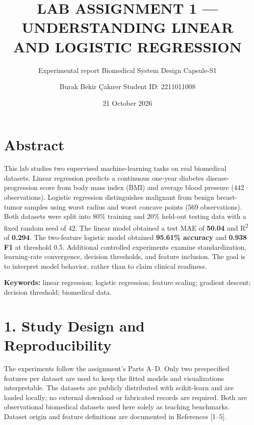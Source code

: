 \documentclass[
  10pt,
]{article}
\title{LAB ASSIGNMENT 1 --- UNDERSTANDING LINEAR AND LOGISTIC
REGRESSION}
\subtitle{Experimental report \textbar{} Biomedical System Design
Capsule-S1}
\author{Burak Bekir Çakırer \textbar{} Student ID: 2211011008}
\date{21 October 2026}
\begin{document}
\maketitle

\section{Abstract}\label{abstract}

This lab studies two supervised machine-learning tasks on real
biomedical datasets. Linear regression predicts a continuous one-year
diabetes disease-progression score from body mass index (BMI) and
average blood pressure (442 observations). Logistic regression
distinguishes malignant from benign breast-tumor samples using worst
radius and worst concave points (569 observations). Both datasets were
split into 80\% training and 20\% held-out testing data with a fixed
random seed of 42. The linear model obtained a test MAE of
\textbf{50.04} and R\textsuperscript{2} of \textbf{0.294}. The two-feature logistic model
obtained \textbf{95.61\% accuracy} and \textbf{0.938 F1} at threshold
0.5. Additional controlled experiments examine standardization,
learning-rate convergence, decision thresholds, and feature inclusion.
The goal is to interpret model behavior, rather than to claim clinical
readiness.

\textbf{Keywords:} linear regression; logistic regression; feature
scaling; gradient descent; decision threshold; biomedical data.

\section{1. Study Design and
Reproducibility}\label{study-design-and-reproducibility}

The experiments follow the assignment's Parts A--D. Only two
prespecified features per dataset are used to keep the fitted models and
visualizations interpretable. The datasets are publicly distributed with
scikit-learn and are loaded locally; no external download or fabricated
records are required. Both are observational biomedical datasets used
here solely as teaching benchmarks. Dataset origin and feature
definitions are documented in References {[}1--5{]}.
\end{document}

